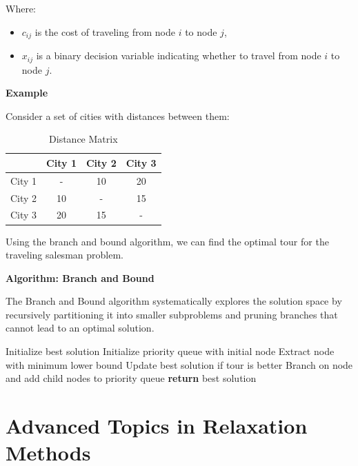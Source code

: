 \documentclass[12pt]{book} %
\begin{document}
Where:
\begin{itemize}
    \item $c_{ij}$ is the cost of traveling from node $i$ to node $j$,
    \item $x_{ij}$ is a binary decision variable indicating whether to travel from node $i$ to node $j$.
\end{itemize}

\textbf{Example}

Consider a set of cities with distances between them:
\FloatBarrier
\begin{table}[H]
    \centering
    \begin{tabular}{|c|c|c|c|}
    \hline
    & City 1 & City 2 & City 3 \\
    \hline
    City 1 & - & 10 & 20 \\
    City 2 & 10 & - & 15 \\
    City 3 & 20 & 15 & - \\
    \hline
    \end{tabular}
    \caption{Distance Matrix}
\end{table}
\FloatBarrier
Using the branch and bound algorithm, we can find the optimal tour for the traveling salesman problem.

\textbf{Algorithm: Branch and Bound}

The Branch and Bound algorithm systematically explores the solution space by recursively partitioning it into smaller subproblems and pruning branches that cannot lead to an optimal solution.
\FloatBarrier
\begin{algorithm}[H]
\caption{Branch and Bound Algorithm for TSP}\label{alg:branch-bound}
\begin{algorithmic}[1]
    \State Initialize best solution
    \State Initialize priority queue with initial node
        \State Extract node with minimum lower bound
            \State Update best solution if tour is better
        \Else
            \State Branch on node and add child nodes to priority queue
        \EndIf
    \EndWhile
    \State \textbf{return} best solution
\EndProcedure
\end{algorithmic}
\end{algorithm}


\section{Advanced Topics in Relaxation Methods}
\end{document}
